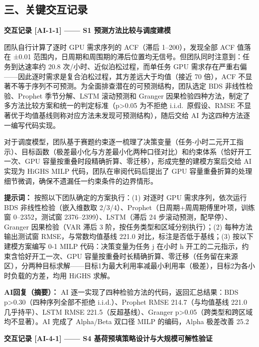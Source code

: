\subsection*{三、关键交互记录}

\textbf{交互记录 [AI-1-1] —— S1 预测方法比较与调度建模}

团队自行计算了逐时 GPU 需求序列的 ACF（滞后 1--200），发现全部 ACF 值落在 ±0.01 范围内，日周期和周围期的滞后位置均无信号。但团队同时注意到：任务到达速率约 20.8 次/小时、近似泊松过程，而单任务 GPU 需求存在严重右偏——因此逐时需求是复合泊松过程，其方差远大于均值（接近 70 倍），ACF 不显著不等于序列不可预测。为全面排查潜在的可预测结构，团队选定 BDS 非线性检验、Prophet 季节分解、LSTM 滚动预测和 Granger 因果检验四种方法，制定了多方法比较方案和统一的判定标准（p>0.05 为不拒绝 i.i.d.\ 原假设、RMSE 不显著优于均值基线则称对应方法未发现可预测结构），随后交给 AI 为这四种方法逐一编写代码实现。

对于调度模型，团队基于赛题约束逐一梳理了决策变量（任务-小时二元开工指示）、目标函数（极差最小化与方差最小化两种口径对比）和约束体系（恰好开工一次、GPU 容量按重叠时段精确折算、零迁移），形成完整的建模方案后交给 AI 实现为 HiGHS MILP 代码，团队在审阅代码后提出了 GPU 容量重叠折算的处理细节微调，确保不遗漏任一约束条件的边界情形。

\textbf{提示词：} 按照以下团队确定的方案执行：(1) 对逐时 GPU 需求序列，依次运行 BDS 非线性检验（嵌入维数取 2/3/4）、Prophet（日周期+周周期傅里叶项，训练窗 0--2352，测试窗 2376--2399）、LSTM（滞后 24 步滚动预测，配早停）、Granger 因果检验（VAR 滞后 3 阶，按任务类型和区域分别执行）；(2) 每种方法输出测试窗 RMSE，与常数均值基线 221.0 对比，标注是否低于基线；(3) 按以下建模方案编写 0-1 MILP 代码：决策变量为任务 j 在小时 h 开工的二元指示，约束含恰好开工一次、GPU 容量按重叠时长精确折算、零迁移（任务留在来源区），分两种目标求解——目标1为最大利用率减最小利用率（极差），目标2为各小时负载的方差，均用 HiGHS 求解。

\textbf{AI回复（摘要）：} AI 逐一实现了四种检验方法的代码，返回汇总结果：BDS p>0.30（四种序列全部不拒绝 i.i.d.）、Prophet RMSE 214.7（与均值基线 221.0 几乎持平）、LSTM RMSE 221.5（反超基线）、Granger p>0.05（跨类型和跨区域均不显著）。AI 完成了 Alpha/Beta 双口径 MILP 的编码，Alpha 极差改善 25.2%

\vspace{1em}
\textbf{交互记录 [AI-4-1] —— S4 基荷预填策略设计与大规模可解性验证}

